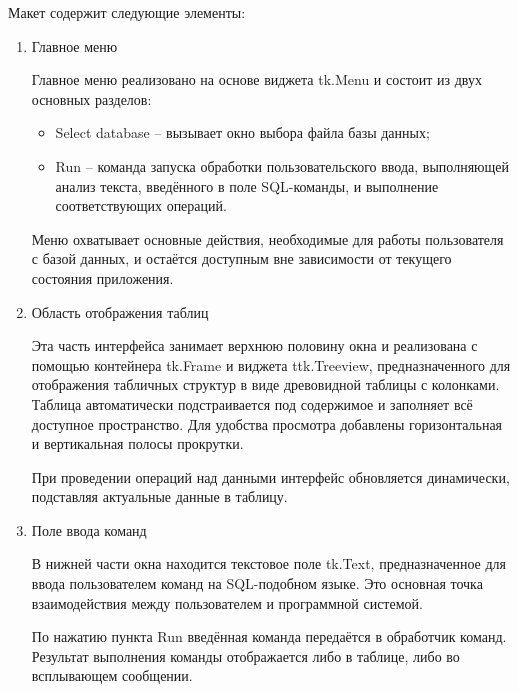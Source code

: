 Макет содержит следующие элементы:
\begin{enumerate}
	\item Главное меню
	
	Главное меню реализовано на основе виджета tk.Menu и состоит из двух основных разделов:
	\begin{itemize}
		\item Select database -- вызывает окно выбора файла базы данных;
		\item Run -- команда запуска обработки пользовательского ввода, выполняющей анализ текста, введённого в поле SQL-команды, и выполнение соответствующих операций.
	\end{itemize}
	Меню охватывает основные действия, необходимые для работы пользователя с базой данных, и остаётся доступным вне зависимости от текущего состояния приложения.
	
	\item Область отображения таблиц
	
	Эта часть интерфейса занимает верхнюю половину окна и реализована с помощью контейнера tk.Frame и виджета ttk.Treeview, предназначенного для отображения табличных структур в виде древовидной таблицы с колонками. Таблица автоматически подстраивается под содержимое и заполняет всё доступное пространство. Для удобства просмотра добавлены горизонтальная и вертикальная полосы прокрутки.
	
	При проведении операций над данными интерфейс обновляется динамически, подставляя актуальные данные в таблицу.
	
	\item Поле ввода команд
	
	В нижней части окна находится текстовое поле tk.Text, предназначенное для ввода пользователем команд на SQL-подобном языке. Это основная точка взаимодействия между пользователем и программной системой.
	
	По нажатию пункта Run введённая команда передаётся в обработчик команд. Результат выполнения команды отображается либо в таблице, либо во всплывающем сообщении.
\end{enumerate}
